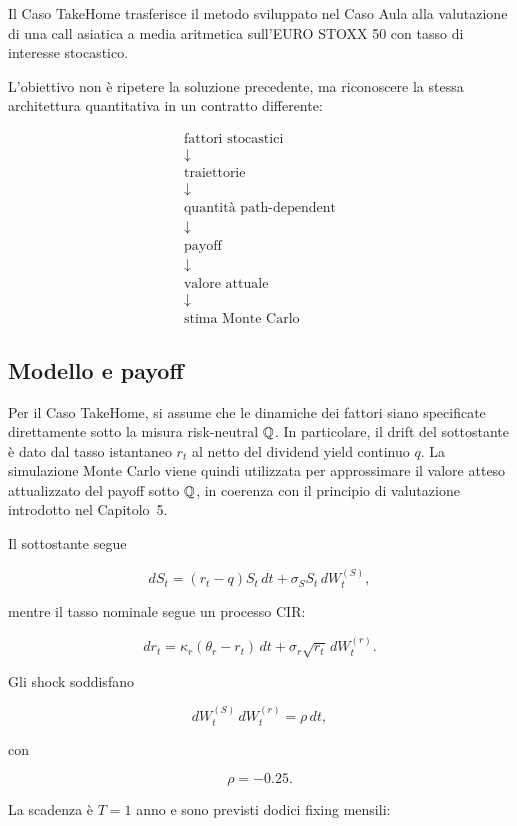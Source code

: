 Il Caso TakeHome trasferisce il metodo sviluppato nel Caso Aula alla
valutazione di una call asiatica a media aritmetica sull'EURO STOXX 50 con
tasso di interesse stocastico.

L'obiettivo non \`e ripetere la soluzione precedente, ma riconoscere la stessa
architettura quantitativa in un contratto differente:

\begin{gather*}
\text{fattori stocastici}\\
\downarrow\\
\text{traiettorie}\\
\downarrow\\
\text{quantit\`a path-dependent}\\
\downarrow\\
\text{payoff}\\
\downarrow\\
\text{valore attuale}\\
\downarrow\\
\text{stima Monte Carlo}
\end{gather*}


\subsection{Modello e payoff}

Per il Caso TakeHome, si assume che le dinamiche dei fattori siano
specificate direttamente sotto la misura risk-neutral $\mathbb{Q}$. In
particolare, il drift del sottostante \`{e} dato dal tasso istantaneo
$r_t$ al netto del dividend yield continuo $q$. La simulazione Monte
Carlo viene quindi utilizzata per approssimare il valore atteso
attualizzato del payoff sotto $\mathbb{Q}$, in coerenza con il principio di
valutazione introdotto nel Capitolo~5.

Il sottostante segue

\[
dS_t
=
(r_t-q)S_t\,dt
+
\sigma_S S_t\,dW_t^{(S)},
\]

\noindent mentre il tasso nominale segue un processo CIR:

\[
dr_t
=
\kappa_r(\theta_r-r_t)\,dt
+
\sigma_r\sqrt{r_t}\,dW_t^{(r)}.
\]

Gli shock soddisfano

\[
dW_t^{(S)}\,dW_t^{(r)}
=
\rho\,dt,
\]

\noindent con

\[
\rho=-0.25.
\]

La scadenza \`e \(T=1\) anno e sono previsti dodici fixing mensili:

